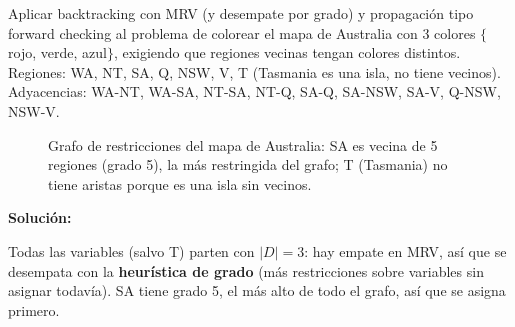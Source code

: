 \begin{exercise}
    Aplicar backtracking con MRV (y desempate por grado) y propagación tipo forward checking al problema de colorear el
    mapa de Australia con 3 colores $\{$rojo, verde, azul$\}$, exigiendo que regiones vecinas tengan colores distintos.
    Regiones: WA, NT, SA, Q, NSW, V, T (Tasmania es una isla, no tiene vecinos). Adyacencias: WA-NT, WA-SA, NT-SA, NT-Q,
    SA-Q, SA-NSW, SA-V, Q-NSW, NSW-V.

    \begin{figure}[H]
    \centering
    \caption{Grafo de restricciones del mapa de Australia: SA es vecina de 5 regiones (grado 5), la más restringida
    del grafo; T (Tasmania) no tiene aristas porque es una isla sin vecinos.}
    \end{figure}

    \textbf{Solución:}

    Todas las variables (salvo T) parten con $|D|=3$: hay empate en MRV, así que se desempata con la \textbf{heurística
    de grado} (más restricciones sobre variables sin asignar todavía). SA tiene grado 5, el más alto de todo el grafo,
    así que se asigna primero.


\end{exercise}
